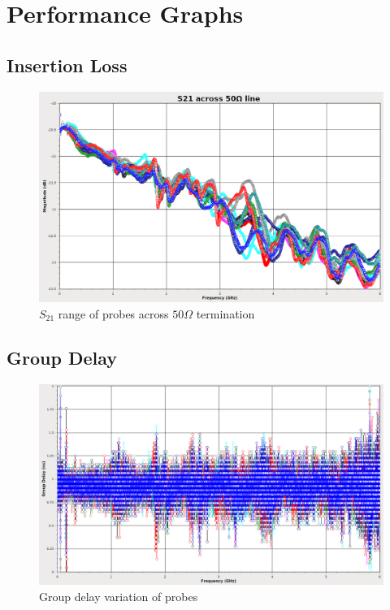 \documentclass[11pt]{article}
\begin{document}
\pagebreak
\section{Performance Graphs}

\subsection{Insertion Loss}

\begin{figure}[h!]
\centering
\includegraphics[width=14cm]{s21-variation.png}
\caption{$S_{21}$ range of probes across $50\Omega$ termination}
\label{s21-variation}
\end{figure}

\subsection{Group Delay}

\begin{figure}[h]
\centering
\includegraphics[width=14cm]{groupdelay-variation.png}
\caption{Group delay variation of probes}
\label{typical-groupdelay}
\end{figure}
\FloatBarrier
\end{document}
